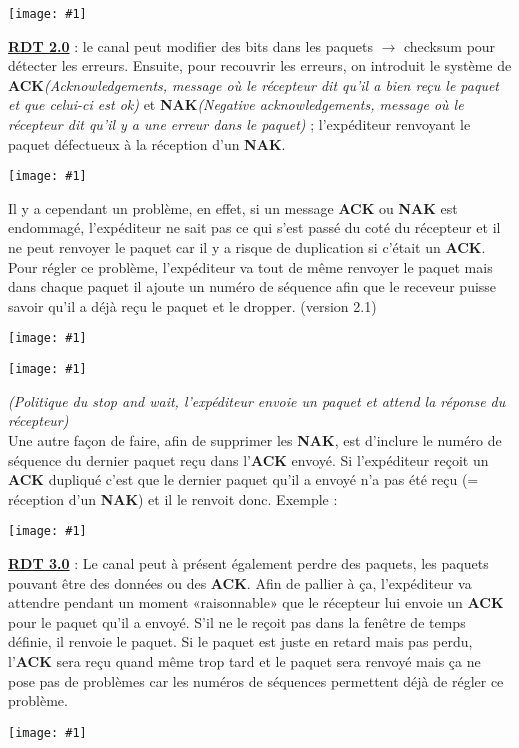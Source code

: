 \documentclass{article}
\newcommand{\imgR}[2]{\begin{center}\texttt{[image: \#1]}\end{center}}
\begin{document}
\imgR{CN_028.png}{300}

\textbf{\underline{RDT 2.0}} : le canal peut modifier des bits dans les paquets $\rightarrow$ checksum pour 
détecter les erreurs. Ensuite, pour recouvrir les erreurs, on introduit le système de 
\textbf{ACK}\textit{(Acknowledgements, message où le récepteur dit qu'il a bien reçu le paquet et que celui-ci
est ok)} et \textbf{NAK}\textit{(Negative acknowledgements, message où le récepteur dit qu'il y a une erreur 
dans le paquet)} ; l'expéditeur renvoyant le paquet défectueux à la réception d'un \textbf{NAK}.

\imgR{CN_029.png}{300}
Il y a cependant un problème, en effet, si un message \textbf{ACK} ou \textbf{NAK} est endommagé, l'expéditeur 
ne sait pas ce qui s'est passé du coté du récepteur et il ne peut renvoyer le paquet car il y a risque de 
duplication si c'était un \textbf{ACK}. Pour régler ce problème, l'expéditeur va tout de même renvoyer le paquet 
mais dans chaque paquet il ajoute un numéro de séquence afin que le receveur puisse savoir qu'il a déjà reçu le 
paquet et le dropper. (version 2.1)

\imgR{CN_030.png}{300}
\imgR{CN_031.png}{400}

\textit{(Politique du stop and wait, l'expéditeur envoie un paquet et attend la réponse du récepteur)} \\

Une autre façon de faire, afin de supprimer les \textbf{NAK}, est d'inclure le numéro de séquence du dernier 
paquet reçu dans l'\textbf{ACK} envoyé. Si l'expéditeur reçoit un \textbf{ACK} dupliqué c'est que le dernier 
paquet qu'il a envoyé n'a pas été reçu (= réception d'un \textbf{NAK}) et il le renvoit donc. Exemple : 

\imgR{CN_032.png}{300}

\newpage

\underline{\textbf{RDT 3.0}} : Le canal peut à présent également perdre des paquets, les paquets pouvant être
des données ou des \textbf{ACK}. Afin de pallier à ça, l'expéditeur va attendre pendant un moment «raisonnable»
que le récepteur lui envoie un \textbf{ACK} pour le paquet qu'il a envoyé. S'il ne le reçoit pas dans la fenêtre 
de temps définie, il renvoie le paquet. Si le paquet est juste en retard mais pas perdu, l'\textbf{ACK} sera 
reçu quand même trop tard et le paquet sera renvoyé mais ça ne pose pas de problèmes car les numéros de 
séquences permettent déjà de régler ce problème.

\imgR{CN_033.png}{400}
\end{document}
